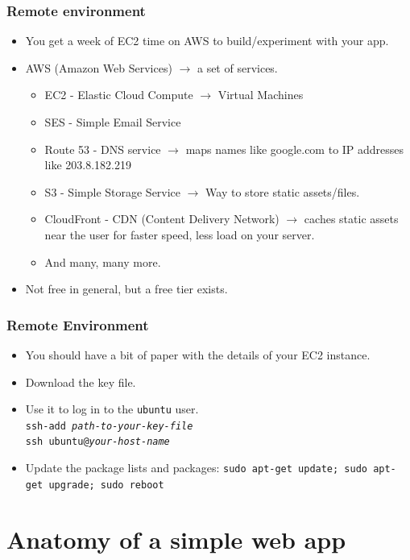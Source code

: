 \documentclass{beamer}
\begin{document}
\begin{frame}
  \frametitle{Remote environment}
  
  \begin{itemize}
  \item You get a week of EC2 time on AWS to build/experiment with your app.
  \item AWS (Amazon Web Services) $\to$ a set of services.
    \begin{itemize}
    \item EC2 - Elastic Cloud Compute $\to$ Virtual Machines
    \item SES - Simple Email Service
    \item Route 53 - DNS service $\to$ maps names like google.com to
      IP addresses like 203.8.182.219
    \item S3 - Simple Storage Service $\to$ Way to store static assets/files.
    \item CloudFront - CDN (Content Delivery Network) $\to$ caches
      static assets near the user for faster speed, less load on your
      server.
    \item And many, many more.
    \end{itemize}
  \item Not free in general, but a free tier exists.
  \end{itemize}
\end{frame}

\begin{frame}
  \frametitle{Remote Environment}
  \begin{itemize}
  \item You should have a bit of paper with the details of your EC2
    instance.
  \item Download the key file.
  \item Use it to log in to the \texttt{ubuntu} user. \\
    \texttt{ssh-add \textit{path-to-your-key-file}} \\
    \texttt{ssh ubuntu@\textit{your-host-name}}
  \item Update the package lists and packages: \texttt{sudo apt-get
      update; sudo apt-get upgrade; sudo reboot}
  \end{itemize}
\end{frame}

\section{Anatomy of a simple web app}
\end{document}
